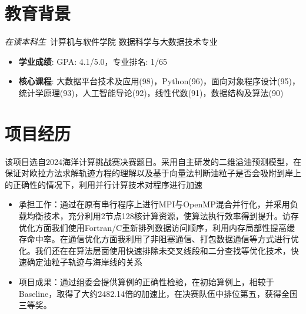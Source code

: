 \documentclass{resume}
\begin{document}


 
\section{教育背景}
\textit{在读本科生}\ 计算机与软件学院 数据科学与大数据技术专业
\begin{itemize}
  \item \textbf{学业成绩}: GPA: 4.1/5.0，专业排名: 1/65
  \item \textbf{核心课程}: 大数据平台技术及应用(98)，Python(96)，面向对象程序设计(95)，统计学原理(93)，人工智能导论(92)，线性代数(91)，数据结构及算法(90)
\end{itemize}

\section{项目经历}
该项目选自2024海洋计算挑战赛决赛题目。采用自主研发的二维溢油预测模型，在保证对欧拉方法求解轨迹方程的理解以及基于向量法判断油粒子是否会吸附到岸上的正确性的情况下，利用并行计算技术对程序进行加速
\begin{itemize}
  \item 承担工作：通过在原有串行程序上进行MPI与OpenMP混合并行化，并采用负载均衡技术，充分利用2节点128核计算资源，使算法执行效率得到提升。访存优化方面我们使用Fortran/C重新排列数据访问顺序，利用内存局部性提高缓存命中率。在通信优化方面我利用了非阻塞通信、打包数据通信等方式进行优化。我们还在在算法层面使用快速排除未交叉线段和二分查找等优化技术，快速确定油粒子轨迹与海岸线的关系
  \item 项目成果：通过组委会提供算例的正确性检验，在初始算例上，相较于Baseline，取得了大约2482.14倍的加速比，在决赛队伍中排位第五，获得全国三等奖。
\end{itemize}
\end{document}
